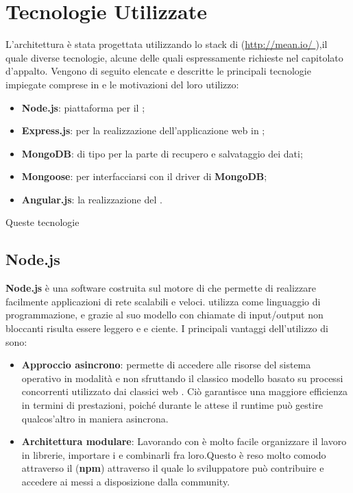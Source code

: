 \section{Tecnologie Utilizzate}
L'architettura è stata progettata utilizzando lo stack di \textbf{} (\url {http://mean.io/ } ),il quale  diverse tecnologie, alcune delle quali espressamente richieste nel capitolato d’appalto. Vengono di seguito elencate e descritte le principali tecnologie impiegate comprese in \textbf{} e le motivazioni del loro utilizzo:
\begin{itemize}
\item \textbf{Node.js}: piattaforma per il ;
\item \textbf{Express.js}:  per la realizzazione dell’applicazione web in  ;
\item \textbf{MongoDB}:  di tipo  per la parte di recupero e salvataggio dei dati; 
\item \textbf{Mongoose}:  per interfacciarsi con il driver di \textbf{MongoDB};
\item \textbf{Angular.js}:   la realizzazione del  .
\end{itemize}

Queste tecnologie 
	\subsection{Node.js}
\textbf{Node.js} è una  software costruita sul motore  di  che permette di realizzare facilmente applicazioni di rete scalabili e veloci.  utilizza  come linguaggio di programmazione, e grazie al suo modello  con chiamate di input/output non bloccanti risulta essere leggero e e ciente.
I principali vantaggi dell'utilizzo di  sono:

\begin{itemize}

\item \textbf{Approccio asincrono}:  permette di accedere alle risorse del sistema operativo in modalità  e non sfruttando il classico modello basato su processi concorrenti utilizzato dai classici web . Ciò garantisce una maggiore efficienza in termini di prestazioni, poiché durante le attese il runtime può gestire qualcos’altro in maniera asincrona.

\item \textbf{Architettura modulare}: Lavorando con  è molto facile organizzare il lavoro in librerie, importare i  e combinarli fra loro.Questo è reso molto comodo attraverso il  (\textbf{npm}) attraverso il quale lo sviluppatore può contribuire e accedere ai  messi a disposizione dalla community.
\end{itemize}
